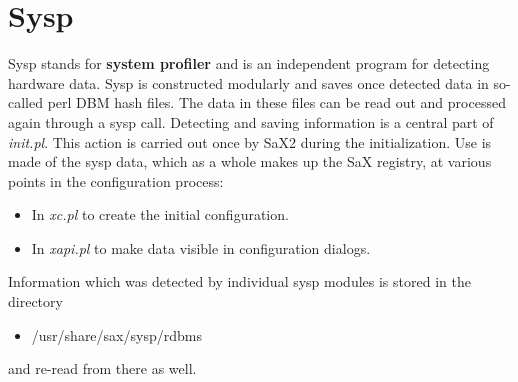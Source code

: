 \chapter{Sysp}
\label{cha:sys}
\minitoc

Sysp stands for \textbf{system profiler} and is an independent program for 
detecting hardware data.
Sysp is constructed modularly and saves once detected data in so-called perl 
DBM hash files. The data in these files can be read out and processed again
through a sysp call. Detecting and saving information is a central part of
\textit{init.pl}.
This action is carried out once by SaX2 during the initialization. Use is made
of the sysp data, which as a whole makes up the SaX registry, at various points in the configuration process:
\begin{itemize}
\item In \textit{xc.pl} to create the initial configuration.
\item In \textit{xapi.pl} to make data visible in configuration dialogs.
\end{itemize} 
Information which was detected by individual sysp modules is stored in the
directory 
\begin{itemize}
\item /usr/share/sax/sysp/rdbms
\end{itemize}
and re-read from there as well.

